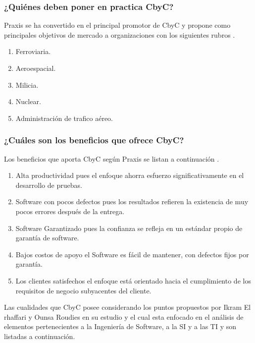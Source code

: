 \documentclass[runningheads,a4paper]{llncs}
\begin{document}
\subsubsection{¿Quiénes deben poner en practica \gls{CbyC}?}
\gls{Praxis} se ha convertido en el principal promotor de \gls{CbyC} y propone como principales objetivos de mercado a organizaciones con los siguientes rubros \cite{CbyCPraxis}.

\begin{enumerate}
	\item Ferroviaria. 
	\item Aeroespacial.
	\item Milicia.
	\item Nuclear.
	\item Administración de trafico aéreo.
\end{enumerate}


\subsubsection{¿Cuáles son los beneficios que ofrece \gls{CbyC}?}
Los beneficios que aporta \gls{CbyC} según \gls{Praxis} se listan a continuación \cite{CbyCHighIntegritySystems}.

\begin{enumerate}
	\item Alta productividad pues el enfoque ahorra esfuerzo significativamente en el desarrollo de pruebas.
	\item \gls{Software} con pocos defectos pues los resultados refieren la existencia de muy pocos errores después de la entrega.
	\item \gls{Software} Garantizado pues la confianza se refleja en un estándar propio de garantía de software.
	\item Bajos costos de apoyo el \gls{Software} es fácil de mantener, con defectos fijos por garantía.
	\item Los clientes satisfechos el enfoque está orientado hacia el cumplimiento de los requisitos de negocio subyacentes del cliente.
\end{enumerate}

Las cualidades que \gls{CbyC} posee considerando los puntos propuestos por Ikram El rhaffari y Ounsa Roudies en su estudio y el cual esta enfocado en el análisis de elementos pertenecientes a la Ingeniería de \gls{Software}, a la \gls{SI} y a las \gls{TI} y son listadas a continuación.  
\end{document}
